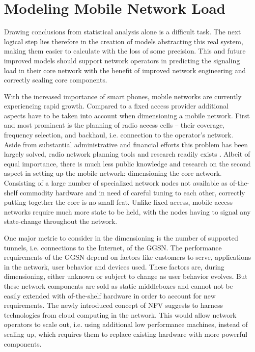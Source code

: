 \section{Modeling Mobile Network Load}
\label{c4:modeling}

Drawing conclusions from statistical analysis alone is a difficult task. The next logical step lies therefore in the creation of models abstracting this real system, making them easier to calculate with the loss of some precision. This and future improved models should support network operators in predicting the signaling load in their core network with the benefit of improved network engineering and correctly scaling core components.



With the increased importance of smart phones, mobile networks are currently experiencing rapid growth.
Compared to a fixed access provider additional aspects have to be taken into account when dimensioning a mobile network. 
First and most prominent is the planning of radio access cells -- their coverage, frequency selection,  and backhaul, i.e. connection to the operator's network. Aside from substantial administrative and financial efforts this problem has been largely solved, radio network planning tools and research readily exists \cite{tutschku1998demand}.
Albeit of equal importance, there is much less public knowledge and research on the second aspect in setting up the mobile network: dimensioning the core network. Consisting of a large number of specialized network nodes not available as of-the-shelf commodity hardware and in need of careful tuning to each other, correctly putting together the core is no small feat. Unlike fixed access, mobile access networks require much more state to be held, with the nodes having to signal any state-change throughout the network.

One major metric to consider in the dimensioning is the number of supported tunnels, i.e. connections to the Internet, of the \gls{GGSN}.
The performance requirements of the \gls{GGSN} depend on factors like customers to serve, applications in the network, user behavior and devices used. These factors are, during dimensioning, either unknown or subject to change as user behavior evolves.
But these network components are sold as static middleboxes and cannot not be easily extended with of-the-shelf hardware in order to account for new requirements.
The newly introduced concept of \gls{NFV} \cite{nfv_whitepaper} suggests to harness technologies from cloud computing in the network. This would allow network operators to scale out, i.e. using additional low performance machines, instead of scaling up, which requires them to replace existing hardware with more powerful components.


